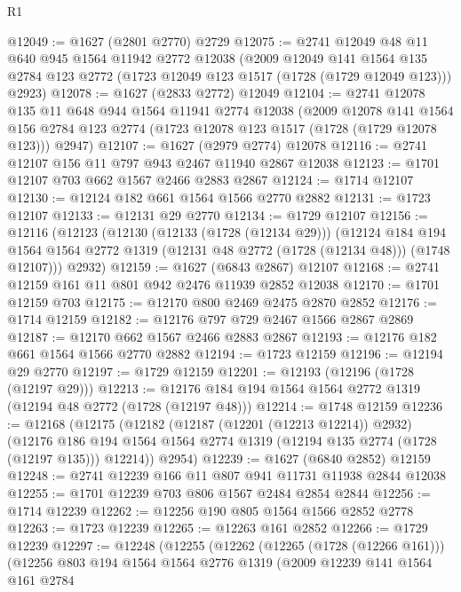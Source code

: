 \begin{lexlean}{R1}
\begin{coremodule}
@12049 := @1627 (@2801 @2770) @2729
@12075 := @2741
    @12049
    @48
    @11
    @640
    @945
    @1564
    @11942
    @2772
    @12038
    (@2009
      @12049
      @141
      @1564
      @135
      @2784
      @123
      @2772
      (@1723 @12049 @123 @1517 (@1728 (@1729 @12049 @123)))
      @2923)
@12078 := @1627 (@2833 @2772) @12049
@12104 := @2741
    @12078
    @135
    @11
    @648
    @944
    @1564
    @11941
    @2774
    @12038
    (@2009
      @12078
      @141
      @1564
      @156
      @2784
      @123
      @2774
      (@1723 @12078 @123 @1517 (@1728 (@1729 @12078 @123)))
      @2947)
@12107 := @1627 (@2979 @2774) @12078
@12116 := @2741 @12107 @156 @11 @797 @943 @2467 @11940 @2867 @12038
@12123 := @1701 @12107 @703 @662 @1567 @2466 @2883 @2867
@12124 := @1714 @12107
@12130 := @12124 @182 @661 @1564 @1566 @2770 @2882
@12131 := @1723 @12107
@12133 := @12131 @29 @2770
@12134 := @1729 @12107
@12156 := @12116
    (@12123
      (@12130
        (@12133 (@1728 (@12134 @29)))
        (@12124
          @184
          @194
          @1564
          @1564
          @2772
          @1319
          (@12131 @48 @2772 (@1728 (@12134 @48)))
          (@1748 @12107)))
      @2932)
@12159 := @1627 (@6843 @2867) @12107
@12168 := @2741 @12159 @161 @11 @801 @942 @2476 @11939 @2852 @12038
@12170 := @1701 @12159 @703
@12175 := @12170 @800 @2469 @2475 @2870 @2852
@12176 := @1714 @12159
@12182 := @12176 @797 @729 @2467 @1566 @2867 @2869
@12187 := @12170 @662 @1567 @2466 @2883 @2867
@12193 := @12176 @182 @661 @1564 @1566 @2770 @2882
@12194 := @1723 @12159
@12196 := @12194 @29 @2770
@12197 := @1729 @12159
@12201 := @12193 (@12196 (@1728 (@12197 @29)))
@12213 := @12176 @184 @194 @1564 @1564 @2772 @1319 (@12194 @48 @2772 (@1728 (@12197 @48)))
@12214 := @1748 @12159
@12236 := @12168
    (@12175
      (@12182
        (@12187 (@12201 (@12213 @12214)) @2932)
        (@12176 @186 @194 @1564 @1564 @2774 @1319 (@12194 @135 @2774 (@1728 (@12197 @135))) @12214))
      @2954)
@12239 := @1627 (@6840 @2852) @12159
@12248 := @2741 @12239 @166 @11 @807 @941 @11731 @11938 @2844 @12038
@12255 := @1701 @12239 @703 @806 @1567 @2484 @2854 @2844
@12256 := @1714 @12239
@12262 := @12256 @190 @805 @1564 @1566 @2852 @2778
@12263 := @1723 @12239
@12265 := @12263 @161 @2852
@12266 := @1729 @12239
@12297 := @12248
    (@12255
      (@12262
        (@12265 (@1728 (@12266 @161)))
        (@12256
          @803
          @194
          @1564
          @1564
          @2776
          @1319
          (@2009
            @12239
            @141
            @1564
            @161
            @2784

\end{coremodule}
\end{lexlean}
